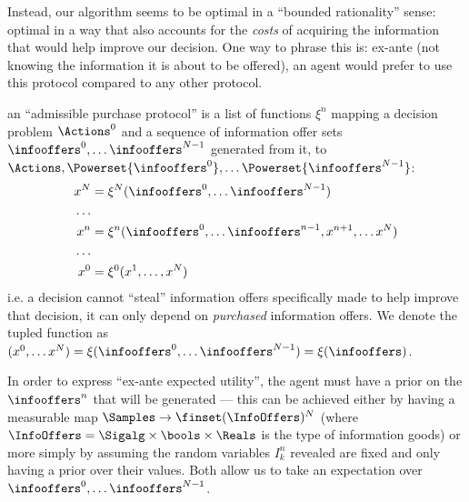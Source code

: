 Instead, our algorithm seems to be optimal in a ``bounded rationality'' sense: optimal in a way that also accounts for the \emph{costs} of acquiring the information that would help improve our decision. One way to phrase this is: ex-ante (not knowing the information it is about to be offered), an agent would prefer to use this protocol compared to any other protocol.

\begin{definition}
  an ``admissible purchase protocol'' is a list of functions $\xi^n$ mapping a decision problem $\Actions^0$ and a sequence of information offer sets $\infooffers^0,\dots\infooffers^{N-1}$ generated from it, to $\Actions,\Powerset{\infooffers^0},\dots\Powerset{\infooffers^{N-1}}$:
  \begin{align*}
    x^N &= \xi^N(\infooffers^0,\dots\infooffers^{N-1}) \\
    \dots&\\
    x^n &= \xi^n(\infooffers^0,\dots\infooffers^{n-1}, x^{n+1},\dots x^N) \\
    \dots&\\
    x^0 &= \xi^0(x^1,\dots, x^N) \\
  \end{align*}
  i.e. a decision cannot ``steal'' information offers specifically made to help improve that decision, it can only depend on \emph{purchased} information offers. We denote the tupled function as $(x^0,\dots x^N)=\xi(\infooffers^0,\dots\infooffers^{N-1})=\xi(\infooffers)$.
  \label{infonomy:def:app}
\end{definition}

In order to express ``ex-ante expected utility'', the agent must have a prior on the $\infooffers^n$ that will be generated --- this can be achieved either by having a measurable map $\Samples\to\finset(\InfoOffers)^N$ (where $\InfoOffers=\Sigalg\times\bools\times\Reals$ is the type of information goods) or more simply by assuming the random variables $I^n_k$ revealed are fixed and only having a prior over their values. Both allow us to take an expectation over $\infooffers^0,\dots\infooffers^{N-1}$.

